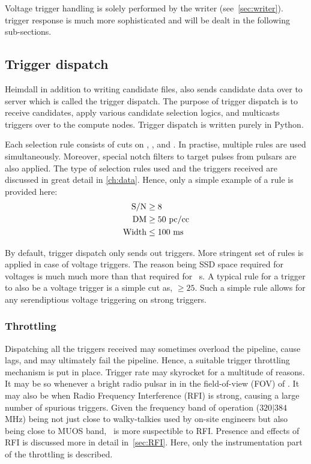 \par Voltage trigger handling is solely performed by the writer (see~\autoref{sec:writer}). \dbson trigger response is much more sophisticated and will be dealt in the following sub-sections.

\subsection {Trigger dispatch}

\par Heimdall in addition to writing candidate files, also sends candidate data over to server which is called the trigger dispatch. 
The purpose of trigger dispatch is to receive candidates, apply various candidate selection logics, and multicasts triggers over to the compute nodes. 
Trigger dispatch is written purely in Python.

\par Each selection rule consists of cuts on \sn, \dm, and \wd. In practise, multiple rules are used simultaneously. Moreover, special notch filters to target pulses from pulsars are also applied. 
The type of selection rules used and the triggers received are discussed in great detail in \autoref{ch:data}. Hence, only a simple example of a rule is provided here:
\begin{align*}
	{\rm S/N} &\geq 8 \\
	{\rm DM} &\geq 50 {\rm\ pc/cc} \\
	{\rm Width} &\leq 100 {\rm\ ms}
\end{align*}

\par By default, trigger dispatch only sends out \dbson triggers. More stringent set of rules is applied in case of voltage triggers. 
The reason being SSD space required for voltages is much much more than that required for \dbson~s. 
A typical rule for a \dbson trigger to also be a voltage trigger is a simple cut as, \sn $\geq 25$. Such a simple rule allows for any serendiptious voltage triggering on strong triggers.

\subsubsection {Throttling}
\label{sssub:rfim}
\par Dispatching all the triggers received may sometimes overload the pipeline, cause lags, and may ultimately fail the pipeline.
Hence, a suitable trigger throttling mechanism is put in place.
Trigger rate may skyrocket for a multitude of reasons. It may be so whenever a bright radio pulsar in in the field-of-view (FOV) of \vf.
It may also be when Radio Frequency Interference (RFI) is strong, causing a large number of spurious triggers.
Given the frequency band of operation ($320|384$ MHz) being not just close to walky-talkies used by on-site engineers but also being close to MUOS band, \vf~is more suspectible to RFI.
Presence and effects of RFI is discussed more in detail in~\autoref{sec:RFI}. 
Here, only the instrumentation part of the throttling is described.

